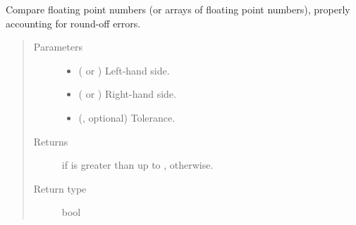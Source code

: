 \documentclass[letterpaper,10pt,english]{sphinxmanual}
\begin{document}
\begin{fulllineitems}
\label{\detokenize{api:tasmania.utils.utils.greater_than}}
Compare floating point numbers (or arrays of floating point numbers), properly accounting for round-off errors.
\begin{quote}\begin{description}
\item[{Parameters}] \leavevmode\begin{itemize}
\item {} 
 ( or ) \textendash{} Left-hand side.

\item {} 
 ( or ) \textendash{} Right-hand side.

\item {} 
 (, optional) \textendash{} Tolerance.

\end{itemize}

\item[{Returns}] \leavevmode
{} if  is greater than  up to ,  otherwise.

\item[{Return type}] \leavevmode
bool

\end{description}\end{quote}

\end{fulllineitems}

\end{document}

